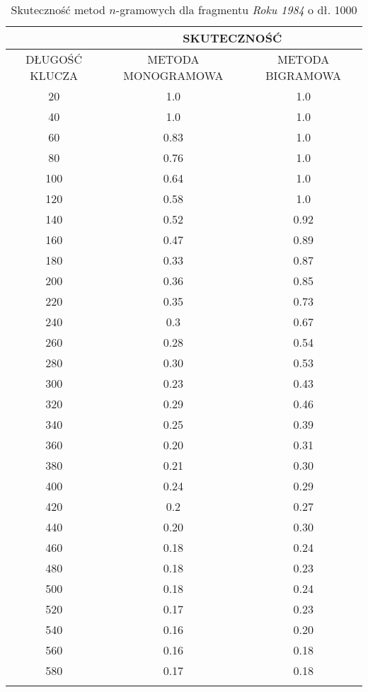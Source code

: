 \documentclass[a4paper]{article}
\theoremstyle{defn}
\theoremstyle{theorem}
\theoremstyle{lemma}
\theoremstyle{cor}
\theoremstyle{fact}
\begin{document}
\begin{center}\begin{longtable}{
|c|c|c|}
\hline &\multicolumn{2}{|c|}{SKUTECZNOŚĆ} \\
\hline DŁUGOŚĆ KLUCZA & METODA MONOGRAMOWA & METODA BIGRAMOWA\\ \hline
20
 & 1.0 & 1.0\\ \hline
40
 & 1.0 & 1.0\\ \hline
60
 & 0.83 & 1.0\\ \hline
80
 & 0.76 & 1.0\\ \hline
100
 & 0.64 & 1.0\\ \hline
120
 & 0.58 & 1.0\\ \hline
140
 & 0.52 & 0.92\\ \hline
160
 & 0.47 & 0.89\\ \hline
180
 & 0.33 & 0.87\\ \hline
200
 & 0.36 & 0.85\\ \hline
220
 & 0.35 & 0.73\\ \hline
240
 & 0.3 & 0.67\\ \hline
260
 & 0.28 & 0.54\\ \hline
280
 & 0.30 & 0.53\\ \hline
300
 & 0.23 & 0.43\\ \hline
320
 & 0.29 & 0.46\\ \hline
340
 & 0.25 & 0.39\\ \hline
360
 & 0.20 & 0.31\\ \hline
380
 & 0.21 & 0.30\\ \hline
400
 & 0.24 & 0.29\\ \hline
420
 & 0.2 & 0.27\\ \hline
440
 & 0.20 & 0.30\\ \hline
460
 & 0.18 & 0.24\\ \hline
480
 & 0.18 & 0.23\\ \hline
500
 & 0.18 & 0.24\\ \hline
520
 & 0.17 & 0.23\\ \hline
540
 & 0.16 & 0.20\\ \hline
560
 & 0.16 & 0.18\\ \hline
580
 & 0.17 & 0.18\\ \hline
   \caption{Skuteczność metod $n$-gramowych dla fragmentu \textit{Roku 1984} o dł. 1000}
\end{longtable}\end{center}
\end{document}
